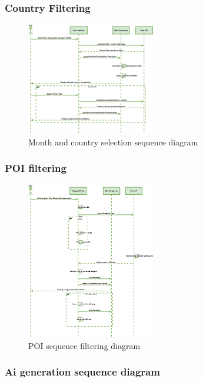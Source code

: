 \documentclass[]{project_final}
\begin{document}
\subsubsection{Country Filtering}

\begin{figure}[ht!]
    \centering
    \includegraphics[width=0.5\textwidth]{countryFiltering.png}
    \vspace*{0.0cm}
    \caption{Month and country selection sequence diagram}
    \label{fig:1}
\end{figure}
\newpage
\subsubsection{POI filtering}

\begin{figure}[ht!]
    \centering
    \includegraphics[width=0.5\textwidth]{TPpoiSequenceDiagram.png}
    \vspace*{0.0cm}
    \caption{POI sequence filtering diagram}
    \label{fig:1}
\end{figure}
\newpage
\subsubsection{Ai generation sequence diagram}
\end{document}
